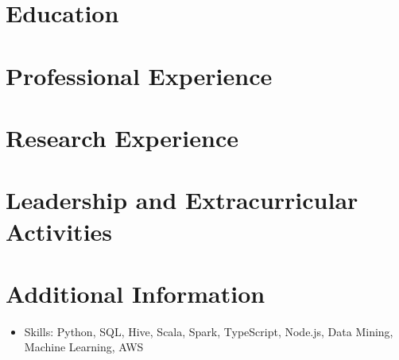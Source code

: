 \documentclass{resumeEN}
\begin{document}
\section{Education}

\pennmaster
\thuundergrad
\umnexchange

\section{Professional Experience}

\amazon
\msra
\bytedance
\continental
\summitview

\section{Research Experience}

\ryanresearch
\umnresearch
\fifaresearch

\section{Leadership and Extracurricular Activities}

\eydatascience
\cnkibibtex
\cydp
\tkd
\semtech

\section{Additional Information}

\vspace{0.618ex}
\begin{itemize}
\item Skills: Python, SQL, Hive, Scala, Spark, TypeScript, Node.js, Data Mining, Machine Learning, AWS
\end{itemize}
\end{document}
